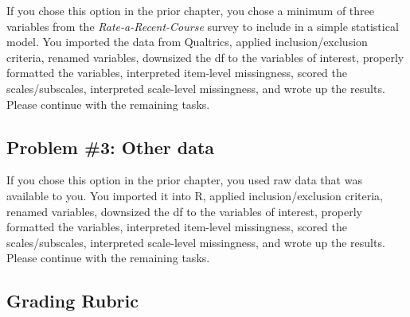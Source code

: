 \documentclass[
  11pt,
]{book}
\begin{document}
If you chose this option in the prior chapter, you chose a minimum of three variables from the \emph{Rate-a-Recent-Course} survey to include in a simple statistical model. You imported the data from Qualtrics, applied inclusion/exclusion criteria, renamed variables, downsized the df to the variables of interest, properly formatted the variables, interpreted item-level missingness, scored the scales/subscales, interpreted scale-level missingness, and wrote up the results. Please continue with the remaining tasks.

\hypertarget{problem-3-other-data-3}{%
\subsection{Problem \#3: Other data}\label{problem-3-other-data-3}}

If you chose this option in the prior chapter, you used raw data that was available to you. You imported it into R, applied inclusion/exclusion criteria, renamed variables, downsized the df to the variables of interest, properly formatted the variables, interpreted item-level missingness, scored the scales/subscales, interpreted scale-level missingness, and wrote up the results. Please continue with the remaining tasks.

\hypertarget{grading-rubric-3}{%
\subsection{Grading Rubric}\label{grading-rubric-3}}
\end{document}
